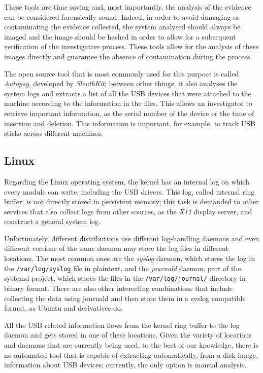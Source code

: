\documentclass[a4paper,twocolumn]{article}
\begin{document}
These tools are time saving and, most importantly, the analysis of the evidence
can be considered forensically sound. Indeed, in order to avoid damaging or
contaminating the evidence collected, the system analysed should always be
imaged and the image should be hashed in order to allow for a subsequent
verification of the investigative process. These tools allow for the analysis of
these images directly and guarantee the absence of contamination during the
process.~\cite{murphey2007automated}

The open source tool that is most commonly used for this purpose is called
\emph{Autopsy}, developed by \emph{SleuthKit}; between other things, it also
analyses the system logs and extracts a list of all the USB devices that were
attached to the machine according to the information in the files. This allows
an investigator to retrieve important information, as the serial number of the
device or the time of insertion and deletion. This information is important, for
example, to track USB sticks across different machines.~\cite{deb2015usb}

\subsection{Linux}
Regarding the Linux operating system, the kernel has an internal log on which
every module can write, including the USB drivers. This log, called internal
ring buffer, is not directly stored in persistent memory; this task is demanded
to other services that also collect logs from other sources, as the \emph{X11}
display server, and construct a general system log.

Unfortunately, different distributions use different log-handling daemons and
even different versions of the same daemon may store the log files in
different locations. The most common ones are the \emph{syslog} daemon, which
stores the log in the \texttt{/var/log/syslog} file in plaintext, and the
\emph{journald} daemon, part of the systemd project, which stores the files in
the \texttt{/var/log/journal/} directory in binary format. There are also other
interesting combinations that include collecting the data using journald and
then store them in a syslog compatible format, as Ubuntu and derivatives
do.~\cite{poettering2012journal}

All the USB related information flows from the kernel ring buffer to the log
daemon and gets stored in one of these locations. Given the variety of locations
and daemons that are currently being used, to the best of our knowledge, there
is no automated tool that is capable of extracting automatically, from a disk
image, information about USB devices; currently, the only option is manual
analysis.
\end{document}
